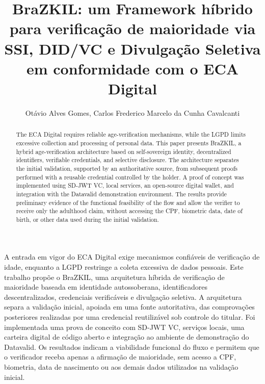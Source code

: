 \documentclass[12pt]{article}
\title{BraZKIL: um Framework híbrido para verificação de maioridade via SSI, DID/VC e Divulgação Seletiva em conformidade com o ECA Digital}
\author{Otávio Alves Gomes\inst{1}, Carlos Frederico Marcelo da Cunha Cavalcanti\inst{1}
}
\newcommand{\fred}[1]{%
\begin{center}
\colorbox{red!20}{\parbox{0.95\linewidth}{\textbf{NOTA:} #1}}
\end{center}
}
\newcommand{\fred}[1]{}
\begin{document}
\maketitle

\begin{resumo}
A entrada em vigor do ECA Digital exige mecanismos confiáveis de verificação de idade, enquanto a LGPD restringe a coleta excessiva de dados pessoais. Este trabalho propõe o BraZKIL, uma arquitetura híbrida de verificação de maioridade baseada em identidade autossoberana,
identificadores descentralizados, credenciais verificáveis e divulgação  seletiva. A arquitetura separa a validação inicial, apoiada em uma fonte autoritativa, das comprovações posteriores realizadas por uma credencial reutilizável sob controle do titular. Foi implementada uma prova de
conceito com SD-JWT VC, serviços locais, uma carteira digital de código aberto e integração ao ambiente de demonstração do Datavalid. Os resultados indicam a viabilidade funcional do fluxo e permitem que o verificador receba apenas a afirmação de maioridade, sem acesso a CPF,
biometria, data de nascimento ou aos demais dados utilizados na validação inicial.
\end{resumo}

\begin{abstract}
The ECA Digital requires reliable age-verification mechanisms, while the LGPD limits excessive collection and processing of personal data. This paper presents BraZKIL, a hybrid age-verification architecture based on self-sovereign identity, decentralized identifiers, verifiable credentials, and selective disclosure. The architecture separates the initial validation, supported by an authoritative source, from subsequent proofs performed with a reusable credential controlled by
the holder. A proof of concept was implemented using SD-JWT VC, local services, an open-source digital wallet, and integration with the Datavalid demonstration environment. The results provide preliminary evidence of the functional feasibility of the flow and allow the verifier to receive only the adulthood claim, without accessing the CPF, biometric data, date of birth, or other data used during the initial validation.
\end{abstract}


\end{document}
